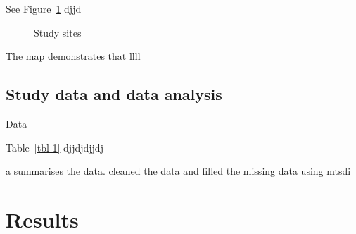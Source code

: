 \documentclass[
  letterpaper,
  DIV=11,
  numbers=noendperiod]{scrartcl}
\begin{document}
See Figure~\ref{fig-1} djjd

\begin{figure}


\caption{\label{fig-1}Study sites}

\end{figure}%

The map demonstrates that llll

\subsection{Study data and data
analysis}\label{study-data-and-data-analysis}

\begin{table}

\caption{\label{tbl-1}Data}


\end{table}%

Table~\ref{tbl-1} djjdjdjjdj

a summarises the data. cleaned the data and filled the missing data
using mtsdi

\section{Results}\label{sec-results}
\end{document}
